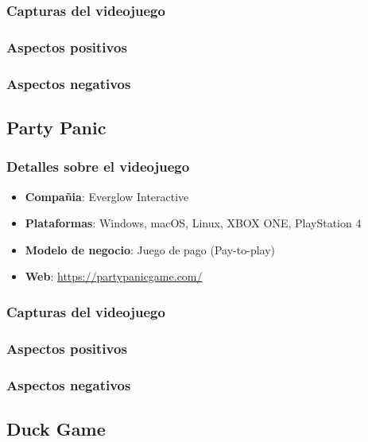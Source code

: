 \documentclass[12pt, spanish]{article}
\begin{document}
\subsubsection{Capturas del videojuego}

\subsubsection{Aspectos positivos}

\subsubsection{Aspectos negativos}


\subsection{Party Panic}

\subsubsection{Detalles sobre el videojuego}

\begin{itemize}
	\item \textbf{Compañia}: Everglow Interactive
	\item \textbf{Plataformas}: Windows, macOS, Linux, XBOX ONE, PlayStation 4
	\item \textbf{Modelo de negocio}: Juego de pago (Pay-to-play)
	\item \textbf{Web}: \url{https://partypanicgame.com/}
\end{itemize}

\subsubsection{Capturas del videojuego}

\subsubsection{Aspectos positivos}

\subsubsection{Aspectos negativos}

\subsection{Duck Game}
\end{document}
